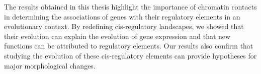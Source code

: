 The results obtained in this thesis highlight the importance of chromatin contacts in determining the associations of genes with their regulatory elements in an evolutionary context. By redefining \gls{cis}-regulatory landscapes, we showed that their evolution can explain the evolution of gene expression and that new functions can be attributed to regulatory elements. Our results also confirm that studying the evolution of these \gls{cis}-regulatory elements can provide hypotheses for major morphological changes.
